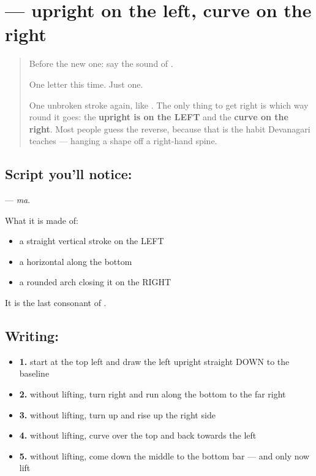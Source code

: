 \section[\texorpdfstring{\ta{ம} (ma)}{ம (ma)}]{ — upright on the left, curve on the right}

\label{lesson:TA-S07-ma}



\begin{quote}
Before the new one: say the sound of \textbf{}.

One letter this time. Just one.

One unbroken stroke again, like . The only thing to get right is which way round it goes: the \textbf{upright is on the LEFT} and the \textbf{curve on the right}. Most people guess the reverse, because that is the habit Devanagari teaches — hanging a shape off a right-hand spine.
\end{quote}

\subsection*{Script you'll notice: }
\textbf{} — \emph{ma}.

What it is made of:

\begin{itemize}
\raggedright
  \item a straight vertical stroke on the LEFT
  \item a horizontal along the bottom
  \item a rounded arch closing it on the RIGHT
\end{itemize}

It is the last consonant of .

\subsection*{Writing: }

\begin{itemize}
\raggedright
  \item \textbf{1.} start at the top left and draw the left upright straight DOWN to the baseline
  \item \textbf{2.} without lifting, turn right and run along the bottom to the far right
  \item \textbf{3.} without lifting, turn up and rise up the right side
  \item \textbf{4.} without lifting, curve over the top and back towards the left
  \item \textbf{5.} without lifting, come down the middle to the bottom bar — and only now lift
\end{itemize}

